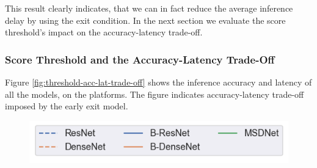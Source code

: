 This result clearly indicates, that we can in fact reduce the average inference delay by using the exit condition. In the next section we evaluate the score threshold's impact on the accuracy-latency trade-off.

\subsubsection{Score Threshold and the Accuracy-Latency Trade-Off}

Figure \ref{fig:threshold-acc-lat-trade-off} shows the inference accuracy and latency of all the models, on the platforms. The figure indicates accuracy-latency trade-off imposed by the early exit model.

\begin{figure}
	\captionsetup[subfigure]{justification=centering,farskip=0pt,captionskip=0pt}
	\centering
	\includegraphics[width=.4\linewidth]{figures/threshold_plots/inference_legend}
	\hfill
	\hfill

\end{figure}
